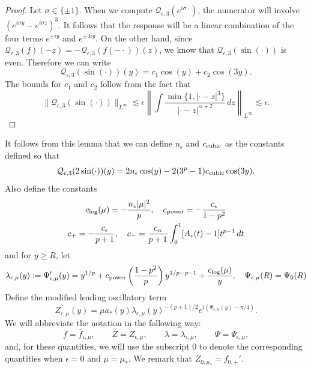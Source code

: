 \documentclass[11pt]{amsart}
\theoremstyle{definition}
\theoremstyle{remark}
\numberwithin{equation}{section}
\newcommand{\mc}[1]{\mathcal{#1}}
\newcommand{\ov}[1]{\overline{#1}}
\begin{document}
\begin{proof}
    Let $\sigma \in \{\pm 1\}$. When we compute $\mc{Q}_{\epsilon, 3}(e^{i\sigma \cdot})$, the numerator will involve $(e^{i\sigma y} - e^{i\sigma z})^3$. It follows that the response will be a linear combination of the four terms $e^{\pm i y}$ and $e^{\pm 3i y}$. On the other hand, since $\mc{Q}_{\epsilon,3}(f)(-z) = -\mc{Q}_{\epsilon,3}(f(-\cdot))(z)$, we know that $\mc{Q}_{\epsilon, 3}(\sin(\cdot))$ is even. Therefore we can write
    \[\mc{Q}_{\epsilon, 3}(\sin(\cdot))(y) = c_1 \cos(y) + c_2 \cos(3y).\]
    The bounds for $c_1$ and $c_2$ follow from the fact that
    \[\|\mc{Q}_{\epsilon,3}(\sin(\cdot))\|_{L^\infty} \lesssim \epsilon \left\|\int \frac{\min\{1, |\cdot - z|^3\}}{|\cdot - z|^{\alpha + 2}} \, dz \right\|_{L^\infty} \lesssim \epsilon.\]
\end{proof}
It follows from this lemma that we can define $n_\epsilon$ and $c_{\textup{cubic}}$ as the constants defined so that 
\begin{equation}\label{eqn:approx_cubic_normalization}
\mc{Q}_{\epsilon,3}(2 \sin(\cdot))(y) = 2n_\epsilon \cos(y) - 2(3^p - 1)c_{\textup{cubic}}\cos(3y).
\end{equation}
Also define the constants
\begin{equation}\label{eqn:approx_correction_constants}
\begin{gathered}
c_{\textup{log}}(\mu)=-\frac{n_\epsilon|\mu|^2}{p}, \quad c_{\textup{power}} =-\frac{c_\epsilon}{1-p^2}\\
c_+=-\frac{c_\epsilon}{p+1}, \quad c_- =\frac{c_\alpha}{p+1}\int_0^1[A_\epsilon(t)-1]t^{p-1}\,dt
\end{gathered}
\end{equation}
and for $y \geq R$, let
\begin{equation}\label{eqn:approx_modified_frequency}
\lambda_{\epsilon, \mu}(y) := \Psi_{\epsilon,\mu}'(y)
   =y^{1/p} + c_{\textup{power}}\left(\frac{1 - p^2}{p}\right) y^{1/p-p-1} +\frac{c_{\textup{log}}(\mu)}{y}, \quad \Psi_{\epsilon,\mu}(R) = \Psi_{0}(R)
\end{equation}
Define the modified leading oscillatory term 
\begin{equation}\label{eqn:approx_Z_definition}
Z_{\epsilon, \mu}(y) = \mu a_*(y) \lambda_{\epsilon, \mu}(y)^{-(p + 1)/2}e^{i(\Psi_{\epsilon,\mu}(y) - \pi/4)}.
\end{equation}
We will abbreviate the notation in the following way:
\[f=\ov{f}_{\epsilon,\mu},\qquad Z=Z_{\epsilon,\mu},\qquad \lambda=\lambda_{\epsilon,\mu},\qquad \Psi=\Psi_{\epsilon,\mu},\]
and, for these quantities, we will use the subscript $0$ to denote the corresponding quantities when $\epsilon=0$ and $\mu=\mu_*$. We remark that $Z_{0, \mu_*} = f_{0,+}'$.
\end{document}
